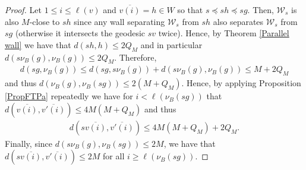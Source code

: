 \documentclass[10pt,a4paper]{amsart}
\newcommand{\W}{\mathcal{W}}
\newcommand{\vr}{\nu}
\begin{document}
\begin{proof}
    Let $1 \leq i \leq \ell(v)$ and $\overline{v(i)} = h \in W$ so that $s \preceq sh \preceq sg$. Then, $\W_s$ is also $M$-close to $sh$ since any wall separating $\W_s$ from $sh$ also separates $\W_s$ from $sg$ (otherwise it intersects the geodesic $sv$ twice). Hence, by Theorem \ref{Parallel wall} we have that $d(sh, h) \leq 2Q_M$ and in particular $d(s\vr_B(g), \vr_B(g)) \leq 2Q_M$. Therefore,
    \begin{align*}
        d(sg, \vr_B(g)) \leq d(sg, s\vr_B(g)) + d(s\vr_B(g), \vr_B(g)) \leq M + 2Q_M
    \end{align*}
    and thus $d(\vr_B(g), \vr_B(sg)) \leq 2(M+Q_M)$. Hence, by applying Proposition \ref{PropFTPa} repeatedly we have for $i < \ell(\vr_B(sg))$ that $d(\overline{v(i)}, \overline{v'(i)}) \leq 4M(M+Q_M)$ and thus
    \begin{align*}
        d(s\overline{v(i)}, \overline{v'(i)}) \leq 4M(M+Q_M) + 2Q_M.
    \end{align*}
    Finally, since $d(s\vr_B(g), \vr_B(sg)) \leq 2M$, we have that $d(s\overline{v(i)}, \overline{v'(i)}) \leq 2M$ for all $i \geq \ell(\vr_B(sg))$.
\end{proof}
\end{document}
